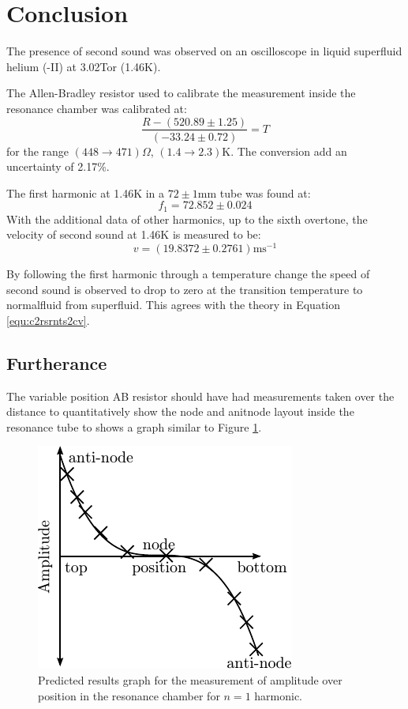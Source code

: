 \section{Conclusion}

The presence of second sound was observed on an oscilloscope in liquid 
superfluid helium (\he-II) at 3.02Tor (1.46K).

The Allen-Bradley resistor used to calibrate the measurement inside the resonance chamber was calibrated at:
$$
\frac{R - (520.89\pm1.25)}{(-33.24\pm0.72)} = T
$$
for the range
$(448 \to 471)\Omega$,  $(1.4 \to 2.3)$K.
The conversion add an uncertainty of 2.17\%.

The first harmonic at 1.46K in a $72\pm1$mm tube was found at:
$$
f_1 = 72.852 \pm 0.024
$$
With the additional data of other harmonics, up to the sixth overtone, the velocity of second sound at 1.46K is measured to be:
$$v = (19.8372 \pm 0.2761) \text{ms}^{-1}$$

By following the first harmonic through a temperature
change the speed of second sound is observed to drop to zero at the transition temperature
to normalfluid from superfluid. This agrees with the theory in Equation \ref{equ:c2rsrnts2cv}.

\subsection{Furtherance}
The variable position AB resistor should have had measurements taken over the distance
to quantitatively show the node and anitnode layout inside the
resonance tube to shows a graph similar to Figure \ref{fig:proposedmesure1}.


\begin{figure}[htbp]
\centering
\includegraphics{pics/proposedmesure1.pdf}
\caption{Predicted results graph for the measurement of amplitude over 
position in the resonance chamber for $n=1$ harmonic.  \label{fig:proposedmesure1}}
\end{figure}

